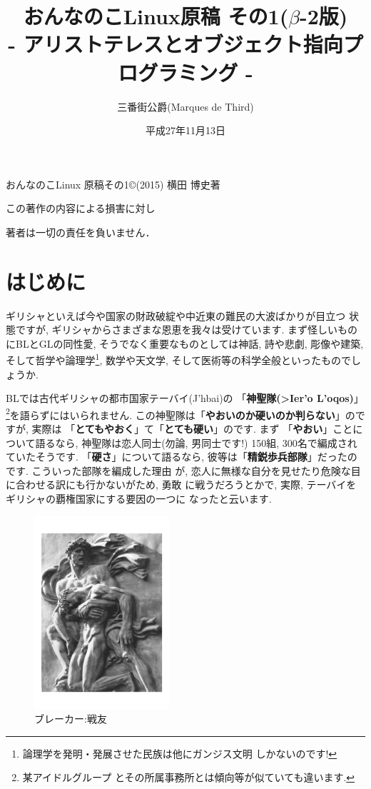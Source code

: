 \documentclass[b5j,8pt,twocolumn]{ltjsarticle}
\title{おんなのこLinux原稿 その1($\beta$-2版)\\
- アリストテレスとオブジェクト指向プログラミング -}
\author{三番街公爵(Marques de Third)}
\date{
平成27年11月13日
 }
\newcommand{\textgreek}[1]{\begingroup\fontencoding{LGR}\selectfont#1\endgroup}
\newcommand{\textgreek}[1]{\begingroup\fontencoding{LGR}\selectfont#1\endgroup}
\begin{document}
\maketitle

\vspace{10cm}

おんなのこLinux 原稿その1\copyright (2015) 横田 博史著\par

この著作の内容による損害に対し

著者は一切の責任を負いません．
\clearpage
\newpage
\setcounter{page}{1}



\section{はじめに}

ギリシャといえば今や国家の財政破綻や中近東の難民の大波ばかりが目立つ
状態ですが, ギリシャからさまざまな恩恵を我々は受けています. まず怪しいもの
にBLとGLの同性愛, そうでなく重要なものとしては神話, 詩や悲劇, 彫像や建築,
 そして哲学や論理学\footnote{論理学を発明・発展させた民族は他にガンジス文明
しかないのです!}, 数学や天文学, そして医術等の科学全般といったものでしょうか. 
\newline

BLでは古代ギリシャの都市国家テーバイ(\textgreek{J'hbai})の
「\textbf{神聖隊(\textgreek{>Ier'o L'oqos})}」\footnote{某アイドルグループ
とその所属事務所とは傾向等が似ていても違います.}を語らずにはいられません.
 この神聖隊は「\textbf{やおいのか硬いのか判らない}」のですが, 実際は
「\textbf{とてもやおく}」て「\textbf{とても硬い}」のです. まず
「\textbf{やおい}」ことについて語るなら, 神聖隊は恋人同士(勿論, 男同士です!)
150組, 300名で編成されていたそうです. 「\textbf{硬さ}」について語るなら,
 彼等は「\textbf{精鋭歩兵部隊}」だったのです. こういった部隊を編成した理由
が, 恋人に無様な自分を見せたり危険な目に合わせる訳にも行かないがため, 勇敢
に戦うだろうとかで, 実際, テーバイをギリシャの覇権国家にする要因の一つに
なったと云います. 
\newline

\begin{figure}
\includegraphics[width=5cm]{arno_breker_kameradschaft.pdf}
\caption{ブレーカー:戦友}
\label{fig:breker2}
\end{figure}
\end{document}
